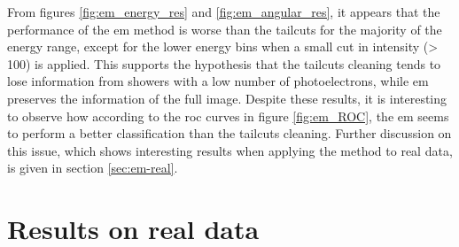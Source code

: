 \documentclass[main.tex]{subfiles}
\begin{document}
From figures \ref{fig:em_energy_res} and \ref{fig:em_angular_res}, it appears that the performance of the \gls{em} method is worse than the tailcuts for the majority of the energy range, except for the lower energy bins when a small cut in intensity (> 100) is applied. This supports the hypothesis that the tailcuts cleaning tends to lose information from showers with a low number of photoelectrons, while \gls{em} preserves the information of the full image. Despite these results, it is interesting to observe how according to the \gls{roc} curves in figure \ref{fig:em_ROC}, the \gls{em} seems to perform a better classification than the tailcuts cleaning. Further discussion on this issue, which shows interesting results when applying the method to real data, is given in section \ref{sec:em-real}.

\section{Results on real data} \label{sec:realdata}
\end{document}
